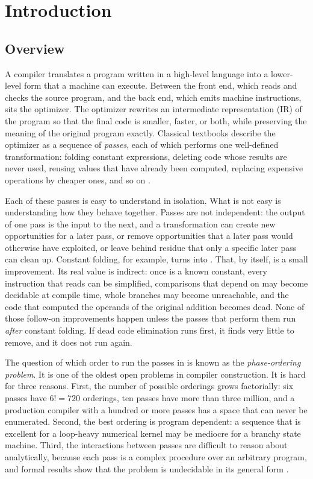 \chapter{Introduction}

\section{Overview}

A compiler translates a program written in a high-level language into a lower-level form that a machine can execute. Between the front end, which reads and checks the source program, and the back end, which emits machine instructions, sits the optimizer. The optimizer rewrites an intermediate representation (IR) of the program so that the final code is smaller, faster, or both, while preserving the meaning of the original program exactly. Classical textbooks describe the optimizer as a sequence of \emph{passes}, each of which performs one well-defined transformation: folding constant expressions, deleting code whose results are never used, reusing values that have already been computed, replacing expensive operations by cheaper ones, and so on \cite{aho2006,cooper2011,muchnick1997}.

Each of these passes is easy to understand in isolation. What is not easy is understanding how they behave together. Passes are not independent: the output of one pass is the input to the next, and a transformation can create new opportunities for a later pass, or remove opportunities that a later pass would otherwise have exploited, or leave behind residue that only a specific later pass can clean up. Constant folding, for example, turns  into . That, by itself, is a small improvement. Its real value is indirect: once  is a known constant, every instruction that reads  can be simplified, comparisons that depend on  may become decidable at compile time, whole branches may become unreachable, and the code that computed the operands of the original addition becomes dead. None of those follow-on improvements happen unless the passes that perform them run \emph{after} constant folding. If dead code elimination runs first, it finds very little to remove, and it does not run again.

The question of which order to run the passes in is known as the \emph{phase-ordering problem}. It is one of the oldest open problems in compiler construction. It is hard for three reasons. First, the number of possible orderings grows factorially: six passes have $6! = 720$ orderings, ten passes have more than three million, and a production compiler with a hundred or more passes has a space that can never be enumerated. Second, the best ordering is program dependent: a sequence that is excellent for a loop-heavy numerical kernel may be mediocre for a branchy state machine. Third, the interactions between passes are difficult to reason about analytically, because each pass is a complex procedure over an arbitrary program, and formal results show that the problem is undecidable in its general form \cite{touati2006}.

